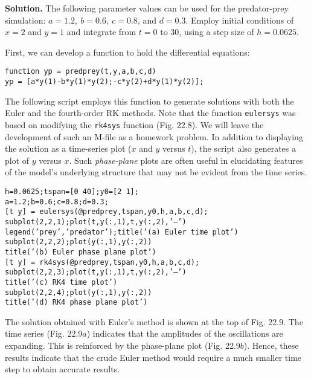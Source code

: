 \documentclass[../main.tex]{subfiles}
\begin{document}
\noindent\textbf{Solution.} The following parameter values can be used for the predator-prey simulation: $a = 1.2,\ b = 0.6,\ c = 0.8$, and $d = 0.3$. Employ initial conditions of $x = 2$ and $y = 1$ and integrate from $t = 0$ to 30, using a step size of $h = 0.0625$.

First, we can develop a function to hold the differential equations:\vspace{\smallskipamount}

\noindent\texttt{function yp = predprey(t,y,a,b,c,d)\\
yp = [a*y(1)-b*y(1)*y(2);-c*y(2)+d*y(1)*y(2)];}\vspace{\medskipamount}

The following script employs this function to generate solutions with both the Euler
and the fourth-order RK methods. Note that the function \texttt{eulersys} was based on modifying the \texttt{rk4sys} function (Fig. 22.8). We will leave the development of such an M-file as a
homework problem. In addition to displaying the solution as a time-series plot ($x$ and $y$
versus $t$), the script also generates a plot of $y$ versus $x$. Such \textit{phase-plane} plots are often
useful in elucidating features of the model's underlying structure that may not be evident
from the time series.\vspace{\medskipamount}

\noindent\texttt{h=0.0625;tspan=[0 40];y0=[2 1];\\
a=1.2;b=0.6;c=0.8;d=0.3;\\}
\noindent\texttt{[t y] = eulersys(@predprey,tspan,y0,h,a,b,c,d);\\}
\noindent\texttt{subplot(2,2,1);plot(t,y(:,1),t,y(:,2),'--')\\
legend('prey','predator');title('(a) Euler time plot')\\
subplot(2,2,2);plot(y(:,1),y(:,2))\\
title('(b) Euler phase plane plot')\\}
\noindent\texttt{[t y] = rk4sys(@predprey,tspan,y0,h,a,b,c,d);\\}
\noindent\texttt{subplot(2,2,3);plot(t,y(:,1),t,y(:,2),'--')\\
title('(c) RK4 time plot')\\
subplot(2,2,4);plot(y(:,1),y(:,2))\\
title('(d) RK4 phase plane plot')}\vspace{\smallskipamount}

The solution obtained with Euler's method is shown at the top of Fig. 22.9. The time
series (Fig. 22.9$a$) indicates that the amplitudes of the oscillations are expanding. This is
reinforced by the phase-plane plot (Fig. 22.9$b$). Hence, these results indicate that the crude
Euler method would require a much smaller time step to obtain accurate results.
\end{document}
